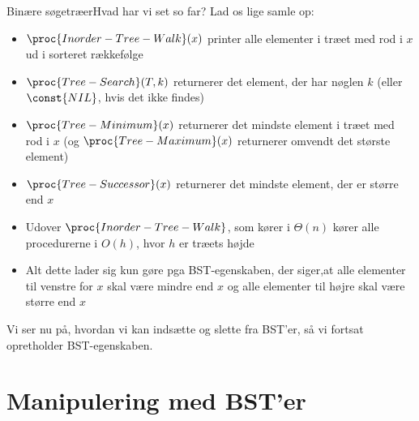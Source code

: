 \documentclass[aspectratio=1610]{beamer}
\begin{document}
\begin{frame}{Binære søgetræer}{Hvad har vi set so far?}
    Lad os lige samle op:

    \begin{itemize}[<+(1)->]
        \item $\proc{Inorder-Tree-Walk}(x)$ printer alle elementer i træet med
            rod i $x$ ud i sorteret rækkefølge
        \item $\proc{Tree-Search}(T,k)$ returnerer det element, der har nøglen $k$
            (eller $\const{NIL}$, hvis det ikke findes)
        \item $\proc{Tree-Minimum}(x)$ returnerer det mindste element i træet
            med rod i $x$ (og $\proc{Tree-Maximum}(x)$ returnerer omvendt det
            største element)
        \item $\proc{Tree-Successor}(x)$ returnerer det mindste element, der er
            større end $x$
        \item Udover $\proc{Inorder-Tree-Walk}$, som kører i $\Theta(n)$ kører
            alle procedurerne i $O(h)$, hvor $h$ er træets højde
        \item Alt dette lader sig kun gøre pga BST-egenskaben, der siger,at alle
            elementer til venstre for $x$ skal være mindre end $x$ og alle
            elementer til højre skal være større end $x$
    \end{itemize}
    \vfill
    \pause
    Vi ser nu på, hvordan vi kan indsætte og slette fra BST'er, så vi fortsat
    opretholder BST-egenskaben.
\end{frame}

\section{Manipulering med BST'er}
\end{document}
